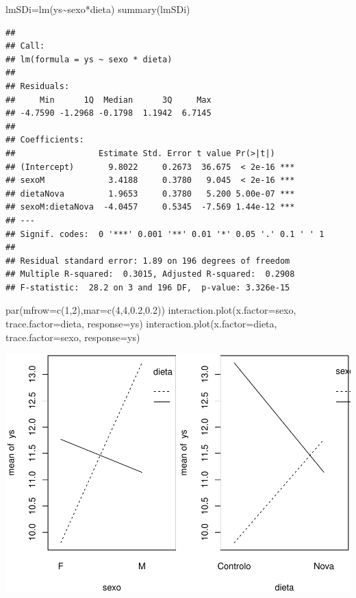 \documentclass[
]{book}
\newenvironment{Shaded}{\begin{snugshade}}{\end{snugshade}}
\newcommand{\AttributeTok}[1]{\textcolor[rgb]{0.77,0.63,0.00}{#1}}
\newcommand{\DecValTok}[1]{\textcolor[rgb]{0.00,0.00,0.81}{#1}}
\newcommand{\FloatTok}[1]{\textcolor[rgb]{0.00,0.00,0.81}{#1}}
\newcommand{\FunctionTok}[1]{\textcolor[rgb]{0.00,0.00,0.00}{#1}}
\newcommand{\NormalTok}[1]{#1}
\newcommand{\OtherTok}[1]{\textcolor[rgb]{0.56,0.35,0.01}{#1}}
\newcommand{\SpecialCharTok}[1]{\textcolor[rgb]{0.00,0.00,0.00}{#1}}
\begin{document}
\begin{Shaded}
\begin{Highlighting}[]
\NormalTok{lmSDi}\OtherTok{=}\FunctionTok{lm}\NormalTok{(ys}\SpecialCharTok{\textasciitilde{}}\NormalTok{sexo}\SpecialCharTok{*}\NormalTok{dieta)}
\FunctionTok{summary}\NormalTok{(lmSDi)}
\end{Highlighting}
\end{Shaded}

\begin{verbatim}
## 
## Call:
## lm(formula = ys ~ sexo * dieta)
## 
## Residuals:
##     Min      1Q  Median      3Q     Max 
## -4.7590 -1.2968 -0.1798  1.1942  6.7145 
## 
## Coefficients:
##                 Estimate Std. Error t value Pr(>|t|)    
## (Intercept)       9.8022     0.2673  36.675  < 2e-16 ***
## sexoM             3.4188     0.3780   9.045  < 2e-16 ***
## dietaNova         1.9653     0.3780   5.200 5.00e-07 ***
## sexoM:dietaNova  -4.0457     0.5345  -7.569 1.44e-12 ***
## ---
## Signif. codes:  0 '***' 0.001 '**' 0.01 '*' 0.05 '.' 0.1 ' ' 1
## 
## Residual standard error: 1.89 on 196 degrees of freedom
## Multiple R-squared:  0.3015, Adjusted R-squared:  0.2908 
## F-statistic:  28.2 on 3 and 196 DF,  p-value: 3.326e-15
\end{verbatim}

\begin{Shaded}
\begin{Highlighting}[]
\FunctionTok{par}\NormalTok{(}\AttributeTok{mfrow=}\FunctionTok{c}\NormalTok{(}\DecValTok{1}\NormalTok{,}\DecValTok{2}\NormalTok{),}\AttributeTok{mar=}\FunctionTok{c}\NormalTok{(}\DecValTok{4}\NormalTok{,}\DecValTok{4}\NormalTok{,}\FloatTok{0.2}\NormalTok{,}\FloatTok{0.2}\NormalTok{))}
\FunctionTok{interaction.plot}\NormalTok{(}\AttributeTok{x.factor=}\NormalTok{sexo, }\AttributeTok{trace.factor=}\NormalTok{dieta, }\AttributeTok{response=}\NormalTok{ys)}
\FunctionTok{interaction.plot}\NormalTok{(}\AttributeTok{x.factor=}\NormalTok{dieta, }\AttributeTok{trace.factor=}\NormalTok{sexo, }\AttributeTok{response=}\NormalTok{ys)}
\end{Highlighting}
\end{Shaded}

\includegraphics{ECOMODbook_files/figure-latex/a11.1-2.pdf}
\end{document}
